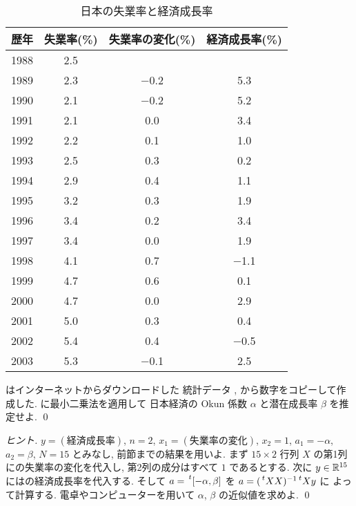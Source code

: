 \documentclass[12pt,twoside]{jarticle}
\begin{document}
\begin{table}[htbp]
  \centering
  \begin{tabular}{cccc}
    歴年 & 失業率(\%) & 失業率の変化(\%) & 経済成長率(\%) \\
    \hline
    1988 & 2.5 & & \\
    1989 & 2.3 & $-$0.2 &  5.3 \\
    1990 & 2.1 & $-$0.2 &  5.2 \\
    1991 & 2.1 &  0.0 &  3.4 \\
    1992 & 2.2 &  0.1 &  1.0 \\
    1993 & 2.5 &  0.3 &  0.2 \\
    1994 & 2.9 &  0.4 &  1.1 \\
    1995 & 3.2 &  0.3 &  1.9 \\
    1996 & 3.4 &  0.2 &  3.4 \\
    1997 & 3.4 &  0.0 &  1.9 \\
    1998 & 4.1 &  0.7 & $-$1.1 \\
    1999 & 4.7 &  0.6 &  0.1 \\
    2000 & 4.7 &  0.0 &  2.9 \\
    2001 & 5.0 &  0.3 &  0.4 \\
    2002 & 5.4 &  0.4 & $-$0.5 \\
    2003 & 5.3 & $-$0.1 &  2.5 \\
  \end{tabular}
  \caption{日本の失業率と経済成長率}
  \label{tab:J}
\end{table}

\begin{question}[日本経済のOkun係数と潜在成長率の推定, 15点]
  はインターネットからダウンロードした
  統計データ \cite{unemp2004}, \cite{SNA2003} から数字をコピーして作成した.
  に最小二乗法を適用して
  日本経済の Okun 係数 $\alpha$ と潜在成長率 $\beta$ を推定せよ.
  \qed
\end{question}

\begin{proof}[ヒント]
  $y=(\text{経済成長率})$, $n=2$, $x_1=(\text{失業率の変化})$, $x_2=1$,
  $a_1=-\alpha$, $a_2=\beta$, $N=15$ とみなし, 前節までの結果を用いよ.
  まず $15\times 2$ 行列 $X$ の第1列にの失業率の変化を代入し,
  第2列の成分はすべて $1$ であるとする.
  次に $y\in{\mathbb R}^{15}$ にはの経済成長率を代入する.
  そして $a=\tp{[-\alpha,\beta]}$ を $a=(\tp{X}X)^{-1}\tp{X}y$ に
  よって計算する.
  電卓やコンピューターを用いて $\alpha$, $\beta$ の近似値を求めよ.
  \qed
\end{proof}
\end{document}
